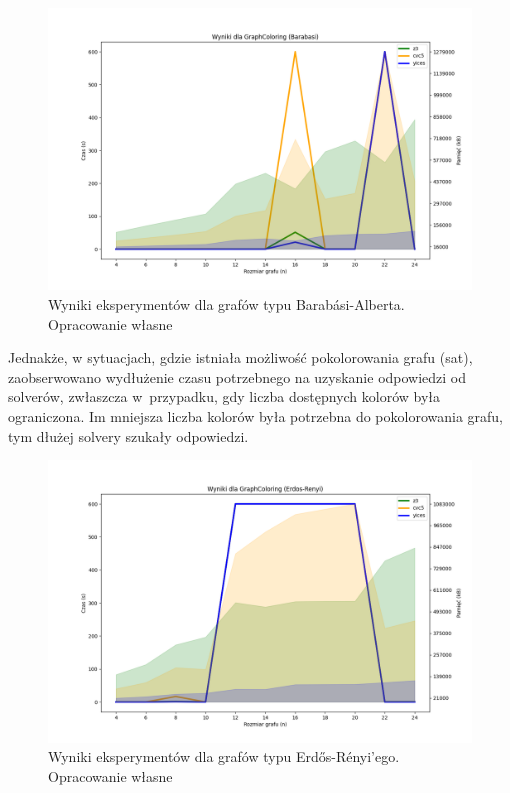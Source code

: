 \begin{figure}[htbp]
	\centering
	\begin{minipage}{\textwidth}
		\includegraphics[width=\textwidth]{./figures/6-barabasi-plot.png}
		\caption{Wyniki eksperymentów dla grafów typu Barabási-Alberta. Opracowanie własne}
		\label{fig:6-barabasi-plot}
	\end{minipage}
\end{figure}

Jednakże, w sytuacjach, gdzie istniała możliwość pokolorowania grafu (sat), zaobserwowano wydłużenie czasu potrzebnego na uzyskanie odpowiedzi od solverów, zwłaszcza w~przypadku, gdy liczba dostępnych kolorów była ograniczona. Im mniejsza liczba kolorów była potrzebna do pokolorowania grafu, tym dłużej solvery szukały odpowiedzi.

\begin{figure}[htbp]
	\centering
	\begin{minipage}{\textwidth}
		\includegraphics[width=\textwidth]{./figures/6-erdos-renyi-plot.png}
		\caption{Wyniki eksperymentów dla grafów typu Erdős-Rényi'ego. Opracowanie własne}
		\label{fig:6-erdos-renyi-plot}
	\end{minipage}
\end{figure}


